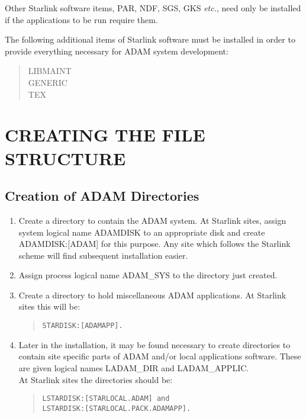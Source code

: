 Other Starlink software items, PAR, NDF, SGS, GKS {\em etc.}, need only be 
installed if the applications to be run require them.

The following additional items of Starlink software must be installed in order
to provide everything necessary for ADAM system development:
\small \begin{quote}
LIBMAINT \\
GENERIC \\
TEX
\end{quote} \normalsize

\section{CREATING THE FILE STRUCTURE}
\subsection{Creation of ADAM Directories}
\label{dirs}
\begin{enumerate}
\item Create a directory to contain the ADAM system.
At Starlink sites, assign system logical name ADAMDISK to an appropriate disk
and create ADAMDISK:[ADAM] for this purpose.
Any site which follows the Starlink scheme will find subsequent installation
easier.
\item Assign process logical name ADAM\_SYS to the directory just created.
\item Create a directory to hold miscellaneous ADAM applications.
At Starlink sites this will be:
\small \begin{quote}
\begin{verbatim}
STARDISK:[ADAMAPP].
\end{verbatim}
\end{quote} \normalsize
\item Later in the installation, it may be found necessary to create directories
to contain site specific parts of ADAM and/or local applications software.
These are given logical names LADAM\_DIR and LADAM\_APPLIC.\\
At Starlink sites the directories should be:
\small \begin{quote}
\begin{verbatim}
LSTARDISK:[STARLOCAL.ADAM] and 
LSTARDISK:[STARLOCAL.PACK.ADAMAPP].
\end{verbatim}
\end{quote} \normalsize
\end{enumerate}

